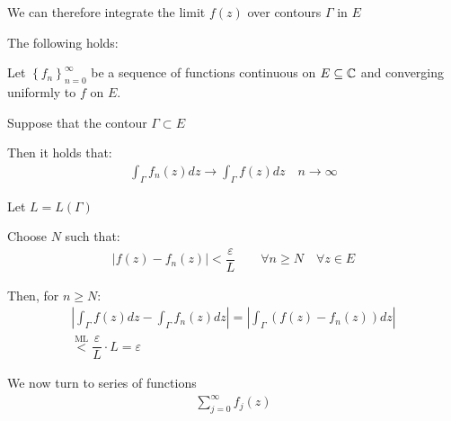 \par\bigskip
\noindent We can therefore integrate the limit $f(z)$ over contours $\Gamma$ in $E$
\par\bigskip
\noindent The following holds:
\par\bigskip
\begin{theo}[]{}
  Let $\left\{f_n\right\}_{n=0}^{\infty}$ be a sequence of functions continuous on $E\subseteq\mathbb{C}$ and converging uniformly to $f$ on $E$.\par
  \noindent Suppose that the contour $\Gamma\subset E$
  \par\bigskip
  \noindent Then it holds that:
  \begin{equation*}
    \begin{gathered}
      \int_{\Gamma}f_n(z)dz\to\int_{\Gamma}f(z)dz\quad n\to\infty
    \end{gathered}
  \end{equation*}
\end{theo}
\par\bigskip
\begin{prf}[]{}
  Let $L = L(\Gamma)$\par
  \noindent Choose $N$ such that:
  \begin{equation*}
    \begin{gathered}
      \left|f(z)-f_n(z)\right|<\dfrac{\varepsilon}{L}\qquad\forall n\geq N\quad\forall z\in E
    \end{gathered}
  \end{equation*}\par
  \noindent Then, for $n\geq N$:
  \begin{equation*}
    \begin{gathered}
      \left|\int_{\Gamma}f(z)dz-\int_{\Gamma}f_n(z)dz\right| = \left|\int_{\Gamma}(f(z)-f_n(z))dz\right|\\
      \stackrel{\text{ML}}{<}\dfrac{\varepsilon}{L}\cdot L = \varepsilon
    \end{gathered}
  \end{equation*}
\end{prf}
\par\bigskip
\noindent We now turn to series of functions 
\begin{equation*}
  \begin{gathered}
    \sum_{j=0}^{\infty}f_j(z)
  \end{gathered}
\end{equation*}
\par\bigskip

